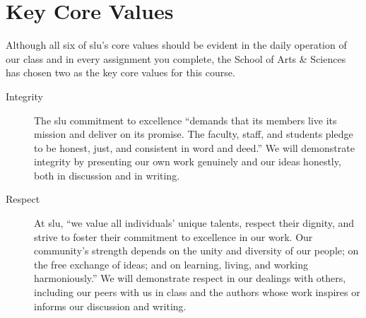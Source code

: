 \documentclass[12pt,oneside]{amsart}	%
\begin{document}
\section{Key Core Values} %
\label{sec:key_core_values}
Although all six of \ac{slu}'s core values should be evident in the daily operation of our class and in every assignment you complete, the School of Arts \& Sciences has chosen two as the key core values for this course.
\begin{description}
	\item [Integrity] The \ac{slu} commitment to excellence ``demands that its members live its mission and deliver on its promise. The faculty, staff, and students pledge to be honest, just, and consistent in word and deed.'' We will demonstrate integrity by presenting our own work genuinely and our ideas honestly, both in discussion and in writing.
	\item [Respect] At \ac{slu}, ``we value all individuals' unique talents, respect their dignity, and strive to foster their commitment to excellence in our work. Our community's strength depends on the unity and diversity of our people; on the free exchange of ideas; and on learning, living, and working harmoniously.'' We will demonstrate respect in our dealings with others, including our peers with us in class and the authors whose work inspires or informs our discussion and writing.
\end{description}

\end{document}
